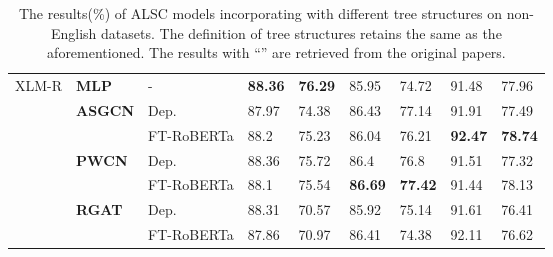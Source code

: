 \documentclass[11pt]{article}
\begin{document}
\begin{table*}[tp]
\begin{tabular}{m{3cm}m{3.3cm}m{2.5cm}m{1.15cm}<{\centering}m{1.15cm}<{\centering}m{1.15cm}<{\centering}m{1.15cm}<{\centering}m{1.15cm}<{\centering}m{1.15cm}<{\centering}}
    \midrule
    \multirow{7}{*}{XLM-R}            & \textbf{MLP}                  & -                               & \textbf{88.36}            & \textbf{76.29}             & 85.95                       & 74.72                    & 91.48                   & 77.96                 \\
                                      & \textbf{ASGCN     }           & Dep.                            & 87.97                     & 74.38                      & 86.43                       & 77.14                    & 91.91                   & 77.49                 \\
                                      &                               & FT-RoBERTa                      & 88.2                      & 75.23                      & 86.04                       & 76.21                    & \textbf{92.47}          & \textbf{78.74}        \\
                                      & \textbf{PWCN      }           & Dep.                            & 88.36                     & 75.72                      & 86.4                        & 76.8                     & 91.51                   & 77.32                 \\
                                      &                               & FT-RoBERTa                      & 88.1                      & 75.54                      & \textbf{86.69}              & \textbf{77.42}           & 91.44                   & 78.13                 \\
                                      & \textbf{RGAT      }           & Dep.                            & 88.31                     & 70.57                      & 85.92                       & 75.14                    & 91.61                   & 76.41                 \\
                                      &                               & FT-RoBERTa                      & 87.86                     & 70.97                      & 86.41                       & 74.38                    & 92.11                   & 76.62                 \\
    \bottomrule
  \end{tabular}
  \caption{The results(\%) of ALSC models incorporating with different tree structures on non-English datasets.  The definition of tree structures retains the same as the aforementioned.  The results with ``'' are retrieved from the original papers.}
  \label{tb:basenoeng}
\end{table*}
\end{document}
